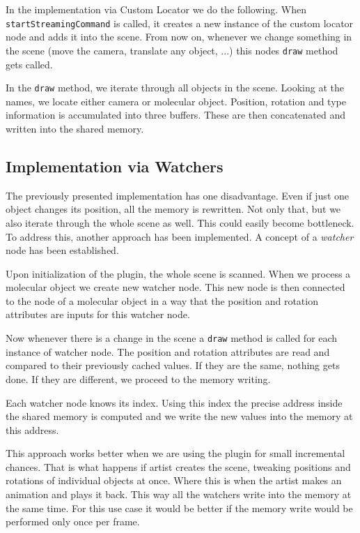 \documentclass[
  digital, %
  table,   %
  nolof,     %
  nolot,     %
  oneside,
]{fithesis3}
\begin{document}
In the implementation via Custom Locator we do the following. When \texttt{startStreamingCommand} is called, it creates a new instance of the custom locator node and adds it into the scene. From now on, whenever we change something in the scene (move the camera, translate any object, ...) this nodes \texttt{draw} method gets called.

In the \texttt{draw} method, we iterate through all objects in the scene. Looking at the names, we locate either camera or molecular object. Position, rotation and type information is accumulated into three buffers. These are then concatenated and written into the shared memory.

\subsection{Implementation via Watchers}
The previously presented implementation has one disadvantage. Even if just one object changes its position, all the memory is rewritten. Not only that, but we also iterate through the whole scene as well. This could easily become bottleneck. To address this, another approach has been implemented. A concept of a \textit{watcher} node has been established.

Upon initialization of the plugin, the whole scene is scanned. When we process a molecular object we create new watcher node. This new node is then connected to the node of a molecular object in a way that the position and rotation attributes are inputs for this watcher node.

Now whenever there is a change in the scene a \texttt{draw} method is called for each instance of watcher node. The position and rotation attributes are read and compared to their previously cached values. If they are the same, nothing gets done. If they are different, we proceed to the memory writing.

Each watcher node knows its index. Using this index the precise address inside the shared memory is computed and we write the new values into the memory at this address.

This approach works better when we are using the plugin for small incremental chances. That is what happens if artist creates the scene, tweaking positions and rotations of individual objects at once. Where this is when the artist makes an animation and plays it back. This way all the watchers write into the memory at the same time. For this use case it would be better if the memory write would be performed only once per frame.
\end{document}

